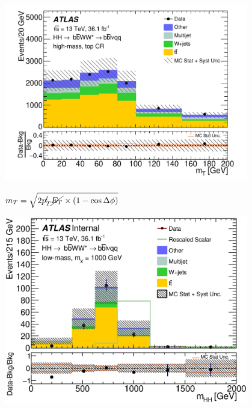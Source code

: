 \documentclass{beamer}
\newcommand*{\met}{\ensuremath{\cancel{E_{T}}}\xspace}
\newcommand*{\header}[1]{\fontsize{16}{8}\selectfont \textbf{{\color{MyPurple}{#1}}}}
\begin{document}
\begin{frame}
\begin{columns}
\begin{column}{0.5\textwidth}
\end{column}
\end{columns}
\end{frame}

\begin{frame}
\begin{center}
\header{Background Shape Check}
\end{center}
\begin{center}
\includegraphics[width=0.8\textwidth]{figures/C_mBBcr_reOpt2000_bbpt350_wlepmtben_regionA_met25d020-eps-converted-to}
\end{center}
\small
$m_T = \sqrt{2p_T^l\met\times{}(1-\cos{\Delta{\phi}})}$
\end{frame}

\begin{frame}
\begin{center}
\header{Results}
\end{center}
\begin{center}
\includegraphics[width=0.8\textwidth]{figures/C_reOpt700_mww_bbpt210_wwpt250_mbb_hhMass_regionA_met25d020}
\end{center}
\end{frame}
\end{document}
